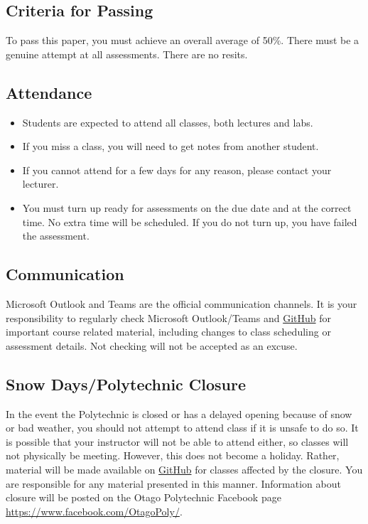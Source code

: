 \documentclass{article}
\begin{document}
\subsection*{Criteria for Passing}
To pass this paper, you must achieve an overall average of 50\%. There must be a genuine attempt at all assessments. There are no resits.

\subsection*{Attendance}
\begin{itemize}
	\item Students are expected to attend all classes, both lectures and labs.
	\item If you miss a class, you will need to get notes from another student.
	\item If you cannot attend for a few days for any reason, please contact your lecturer.
	\item You must turn up ready for assessments on the due date and at the correct time. No extra time will be scheduled. If you do not turn up, you have failed the assessment.
\end{itemize}

\subsection*{Communication}
Microsoft Outlook and Teams are the official communication channels. It is your responsibility to regularly check Microsoft Outlook/Teams and \href{https://github.com/Grayson-Orr/Course-Files}{GitHub} for important course related material, including changes to class scheduling or assessment details. Not checking will not be accepted as an excuse.

\subsection*{Snow Days/Polytechnic Closure}
In the event the Polytechnic is closed or has a delayed opening because of snow or bad weather, you should not attempt to attend class if it is unsafe to do so. It is possible that your instructor will not be able to attend either, so classes will not physically be meeting. However, this does not become a holiday. Rather, material will be made available on \href{https://github.com/Grayson-Orr/Course-Files}{GitHub} for classes affected by the closure. You are responsible for any material presented in this manner. Information about closure will be posted on the Otago Polytechnic Facebook page \href{https://www.facebook.com/OtagoPoly/}{https://www.facebook.com/OtagoPoly/}.
\end{document}
